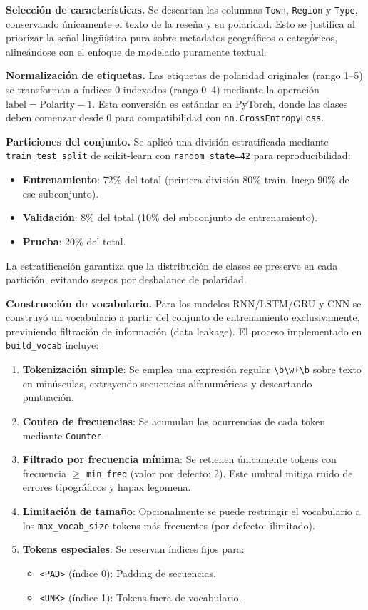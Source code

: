 \documentclass[paper=letter, fontsize=11pt, draft=false]{scrartcl}
\numberwithin{equation}{section} %
\numberwithin{figure}{section} %
\numberwithin{table}{section} %
\numberwithin{subsection}{section}
\begin{document}
\textbf{Selección de características.} Se descartan las columnas \texttt{Town}, \texttt{Region} y \texttt{Type}, conservando únicamente el texto de la reseña y su polaridad. Esto se justifica al priorizar la señal lingüística pura sobre metadatos geográficos o categóricos, alineándose con el enfoque de modelado puramente textual.

\textbf{Normalización de etiquetas.} Las etiquetas de polaridad originales (rango 1–5) se transforman a índices 0-indexados (rango 0–4) mediante la operación $\text{label} = \text{Polarity} - 1$. Esta conversión es estándar en PyTorch, donde las clases deben comenzar desde 0 para compatibilidad con \texttt{nn.CrossEntropyLoss}.

\textbf{Particiones del conjunto.} Se aplicó una división estratificada mediante \texttt{train\_test\_split} de scikit-learn con \texttt{random\_state=42} para reproducibilidad:
\begin{itemize}
    \item \textbf{Entrenamiento}: 72\% del total (primera división 80\% train, luego 90\% de ese subconjunto).
    \item \textbf{Validación}: 8\% del total (10\% del subconjunto de entrenamiento).
    \item \textbf{Prueba}: 20\% del total.
\end{itemize}
La estratificación garantiza que la distribución de clases se preserve en cada partición, evitando sesgos por desbalance de polaridad.

\textbf{Construcción de vocabulario.} Para los modelos RNN/LSTM/GRU y CNN se construyó un vocabulario a partir del conjunto de entrenamiento exclusivamente, previniendo filtración de información (data leakage). El proceso implementado en \texttt{build\_vocab} incluye:
\begin{enumerate}
    \item \textbf{Tokenización simple}: Se emplea una expresión regular \texttt{\textbackslash b\textbackslash w+\textbackslash b} sobre texto en minúsculas, extrayendo secuencias alfanuméricas y descartando puntuación.
    \item \textbf{Conteo de frecuencias}: Se acumulan las ocurrencias de cada token mediante \texttt{Counter}.
    \item \textbf{Filtrado por frecuencia mínima}: Se retienen únicamente tokens con frecuencia $\geq$ \texttt{min\_freq} (valor por defecto: 2). Este umbral mitiga ruido de errores tipográficos y hapax legomena.
    \item \textbf{Limitación de tamaño}: Opcionalmente se puede restringir el vocabulario a los \texttt{max\_vocab\_size} tokens más frecuentes (por defecto: ilimitado).
    \item \textbf{Tokens especiales}: Se reservan índices fijos para:
    \begin{itemize}
        \item \texttt{<PAD>} (índice 0): Padding de secuencias.
        \item \texttt{<UNK>} (índice 1): Tokens fuera de vocabulario.
    \end{itemize}
\end{enumerate}
\end{document}
